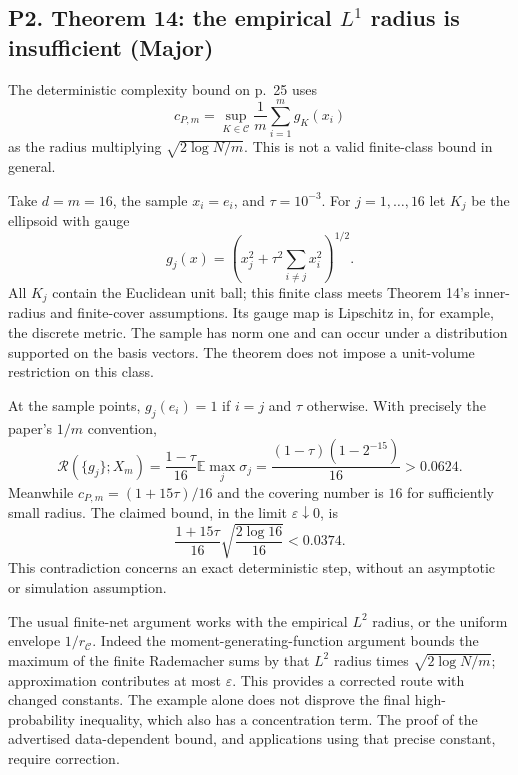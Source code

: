 \documentclass[10pt]{article}
\begin{document}
\subsection*{P2. Theorem 14: the empirical \(L^1\) radius is insufficient (Major)}
The deterministic complexity bound on p. 25 uses \[c_{P,m}=\sup_{K\in\mathcal C}\frac1m\sum_{i=1}^m g_K(x_i)\] as the radius multiplying \(\sqrt{2\log N/m}\). This is not a valid finite-class bound in general.\par
Take \(d=m=16\), the sample \(x_i=e_i\), and \(\tau=10^{-3}\). For \(j=1,\ldots,16\) let \(K_j\) be the ellipsoid with gauge \[g_j(x)=\left(x_j^2+\tau^2\sum_{i\ne j}x_i^2\right)^{1/2}.\] All \(K_j\) contain the Euclidean unit ball; this finite class meets Theorem 14’s inner-radius and finite-cover assumptions. Its gauge map is Lipschitz in, for example, the discrete metric. The sample has norm one and can occur under a distribution supported on the basis vectors. The theorem does not impose a unit-volume restriction on this class.\par
At the sample points, \(g_j(e_i)=1\) if \(i=j\) and \(\tau\) otherwise. With precisely the paper’s \(1/m\) convention, \[\mathcal R(\{g_j\};X_m)
=\frac{1-\tau}{16}\mathbb E\max_j\sigma_j
=\frac{(1-\tau)(1-2^{-15})}{16}>0.0624.\] Meanwhile \(c_{P,m}=(1+15\tau)/16\) and the covering number is \(16\) for sufficiently small radius. The claimed bound, in the limit \(\varepsilon\downarrow0\), is \[\frac{1+15\tau}{16}\sqrt{\frac{2\log16}{16}}<0.0374.\] This contradiction concerns an exact deterministic step, without an asymptotic or simulation assumption.\par
The usual finite-net argument works with the empirical \(L^2\) radius, or the uniform envelope \(1/r_{\mathcal C}\). Indeed the moment-generating-function argument bounds the maximum of the finite Rademacher sums by that \(L^2\) radius times \(\sqrt{2\log N/m}\); approximation contributes at most \(\varepsilon\). This provides a corrected route with changed constants. The example alone does not disprove the final high-probability inequality, which also has a concentration term. The proof of the advertised data-dependent bound, and applications using that precise constant, require correction.\par
\end{document}
